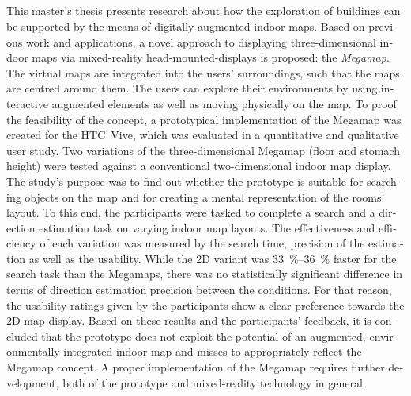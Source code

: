 \begin{otherlanguage}{british}
\chapter*{\abstractname}
\thispagestyle{empty}

This master's thesis presents research about how the exploration of buildings can be supported by the means of digitally augmented indoor maps.
Based on previous work and applications, a novel approach to displaying three-dimensional indoor maps via mixed-reality head-mounted-displays is proposed: the \emph{Megamap}.
The virtual maps are integrated into the users' surroundings, such that the maps are centred around them.
The users can explore their environments by using interactive augmented elements as well as moving physically on the map.
To proof the feasibility of the concept, a prototypical implementation of the Megamap was created for the HTC~Vive, which was evaluated in a quantitative and qualitative user study.
Two variations of the three-dimensional Megamap (floor and stomach height) were tested against a conventional two-dimensional indoor map display.
The study's purpose was to find out whether the prototype is suitable for searching objects on the map and for creating a mental representation of the rooms' layout.
To this end, the participants were tasked to complete a search and a direction estimation task on varying indoor map layouts.
The effectiveness and efficiency of each variation was measured by the search time, precision of the estimation as well as the usability.
While the 2D variant was \SIrange{33}{36}{\percent} faster for the search task than the Megamaps, there was no statistically significant difference in terms of direction estimation precision between the conditions.
For that reason, the usability ratings given by the participants show a clear preference towards the 2D map display.
Based on these results and the participants' feedback, it is concluded that the prototype does not exploit the potential of an augmented, environmentally integrated indoor map and misses to appropriately reflect the Megamap concept.
A proper implementation of the Megamap requires further development, both of the prototype and mixed-reality technology in general.

\end{otherlanguage}
\cleardoublepage
